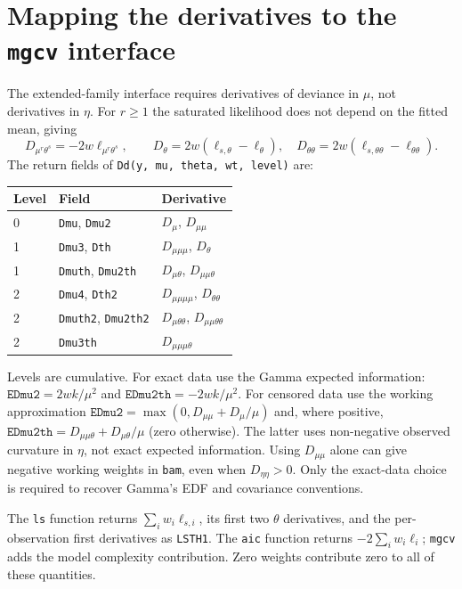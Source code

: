 \documentclass[11pt,a4paper]{article}
\newcommand{\code}[1]{\texttt{#1}}
\begin{document}
\section{Mapping the derivatives to the \texttt{mgcv} interface}
The extended-family interface requires derivatives of deviance in $\mu$,
not derivatives in $\eta$. For $r\geq1$ the saturated likelihood does not
depend on the fitted mean, giving
\[
 D_{\mu^r\theta^s}=-2w\ell_{\mu^r\theta^s},\qquad
 D_\theta=2w(\ell_{s,\theta}-\ell_\theta),\quad
 D_{\theta\theta}=2w(\ell_{s,\theta\theta}-\ell_{\theta\theta}).
\]
The return fields of \code{Dd(y, mu, theta, wt, level)} are:
\begin{center}
\begin{tabular}{lll}
\toprule
Level & Field & Derivative\\
\midrule
0 & \code{Dmu}, \code{Dmu2} & $D_\mu$, $D_{\mu\mu}$\\
1 & \code{Dmu3}, \code{Dth} & $D_{\mu\mu\mu}$, $D_\theta$\\
1 & \code{Dmuth}, \code{Dmu2th} & $D_{\mu\theta}$, $D_{\mu\mu\theta}$\\
2 & \code{Dmu4}, \code{Dth2} & $D_{\mu\mu\mu\mu}$, $D_{\theta\theta}$\\
2 & \code{Dmuth2}, \code{Dmu2th2} & $D_{\mu\theta\theta}$, $D_{\mu\mu\theta\theta}$\\
2 & \code{Dmu3th} & $D_{\mu\mu\mu\theta}$\\
\bottomrule
\end{tabular}
\end{center}
Levels are cumulative. For exact data use the Gamma expected information:
$\code{EDmu2}=2wk/\mu^2$ and $\code{EDmu2th}=-2wk/\mu^2$.
For censored data use the working approximation
$\code{EDmu2}=\max(0,D_{\mu\mu}+D_\mu/\mu)$ and, where positive,
$\code{EDmu2th}=D_{\mu\mu\theta}+D_{\mu\theta}/\mu$ (zero otherwise).
The latter uses non-negative observed curvature in $\eta$, not exact
expected information. Using $D_{\mu\mu}$ alone can give negative working
weights in \code{bam}, even when $D_{\eta\eta}>0$. Only the exact-data
choice is required to recover Gamma's EDF and covariance conventions.

The \code{ls} function returns $\sum_iw_i\ell_{s,i}$, its first two
$\theta$ derivatives, and the per-observation first derivatives as
\code{LSTH1}. The \code{aic} function returns $-2\sum_iw_i\ell_i$;
\code{mgcv} adds the model complexity contribution. Zero weights contribute
zero to all of these quantities.
\end{document}

